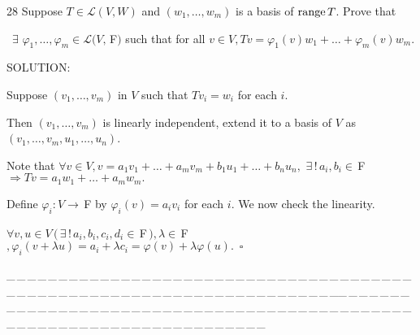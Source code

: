 \documentclass[a4paper, 11pt, UTF8]{article}
\def\range{\textup{range}\,}
\def\Lm{\mathcal{L}}
\def\Fbfc{$\,{\timesbf F}$}
\begin{document}
\begin{large}
{\timesbf\Large 28} {\timessl\Large 
Suppose $T\in\Lm(V,W)$ and $(w_1,\dots,w_m)$ is a basis of $\range T$. Prove that}\par\quad\,
{\timessl\Large $\exists\,\,\varphi_1,\dots,\varphi_m\in\Lm(V,\,${\timesbf F}$)$ such that for all $v\in V,Tv=\varphi_1(v)w_1+\dots+\varphi_m(v)w_m$.
}\par
{\timesbf S\footnotesize{OLUTION:}}\par\quad
Suppose $(v_1,\dots,v_m)$ in $V$ such that $Tv_i=w_i$ for each $i$.\par\qquad
Then $(v_1,\dots,v_m)$ is linearly independent, extend it to a basis of $V$ as $(v_1,\dots,v_m,u_1,\dots,u_n)$.\par\quad
Note that $\forall v\in V,v=a_1 v_1+\dots+a_m v_m+b_1 u_1+\dots+b_n u_n,\,\,\exists\,!\,a_i,b_i\in\Fbfc\Rightarrow Tv=a_1 w_1+\dots+a_m w_m.$\par\quad
Define $\varphi_i:V\rightarrow\,${\timesbf F} by $\varphi_i(v)=a_i v_i$ for each $i$. We now check the linearity.\par\quad
$\forall v,u\in V\,(\,\exists\,!\,a_i,b_i,c_i,d_i\in\Fbfc\,),\lambda\in\Fbfc,\varphi_i(v+\lambda u)=a_i+\lambda c_i=\varphi(v)+\lambda\varphi(u).\,\,\,\square$\par
{\tiny \_\,\_\,\_\,\_\,\_\,\_\,\_\,\_\,\_\,\_\,\_\,\_\,\_\,\_\,\_\,\_\,\_\,\_\,\_\,\_\,\_\,\_\,\_\,\_\,\_\,\_\,\_\,\_\,\_\,\_\,\_\,\_\,\_\,\_\,\_\,\_\,\_\,\_\,\_\,\_\,\_\,\_\,\_\,\_\,\_\,\_\,\_\,\_\,\_\,\_\,\_\,\_\,\_\,\_\,\_\,\_\,\_\,\_\,\_\,\_\,\_\,\_\,\_\,\_\,\_\,\_\,\_\,\_\,\_\,\_\,\_\_\,\_\,\_\,\_\,\_\,\_\,\_\,\_\,\_\,\_\,\_\,\_\,\_\,\_\,\_\,\_\,\_\,\_\,\_\,\_\,\_\,\_\,\_\,\_\,\_\,\_\,\_\,\_\,\_\,\_\,\_\,\_\,\_\,\_\,\_\,\_\,\_\,\_\,\_\,\_\,\_\,\_\,\_\,\_\,\_\,\_\,\_\,\_\,\_\,\_\,\_\,\_\,\_\,\_\,\_\,\_\,\_\,\_\,\_\,\_\,\_\,\_\,\_\,\_\,\_\,\_\,\_\,\_\,\_\,\_\,\_}\par


\end{large}
\end{document}
